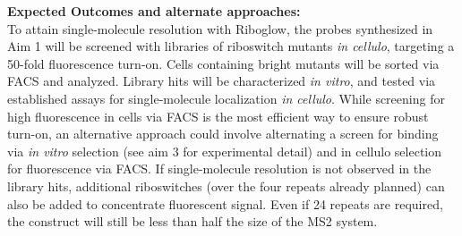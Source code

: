 \textbf{Expected Outcomes and alternate approaches:}\\
To attain single-molecule resolution with Riboglow, the probes synthesized in Aim 1 will be screened with libraries of riboswitch mutants \textit{in cellulo}, targeting a 50-fold fluorescence turn-on. Cells containing bright mutants will be sorted via FACS and analyzed. Library hits will be characterized \textit{in vitro}, and tested via established assays for single-molecule localization \textit{in cellulo}.
While screening for high fluorescence in cells via FACS is the most efficient way to ensure robust turn-on, an alternative approach could involve alternating a screen for binding via \textit{in vitro} selection (see aim 3 for experimental detail) and in cellulo selection for fluorescence via FACS.
If single-molecule resolution is not observed in the library hits, additional riboswitches (over the four repeats already planned) can also be added to concentrate fluorescent signal. Even if 24 repeats are required, the construct will still be less than half the size of the MS2 system.

